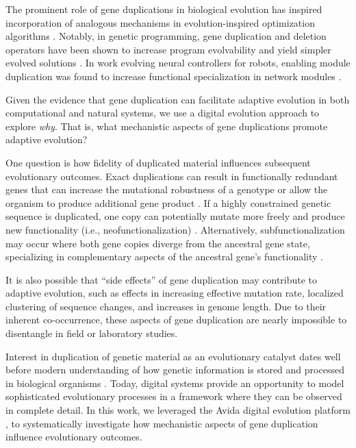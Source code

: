 The prominent role of gene duplications in biological evolution has inspired incorporation of analogous mechanisms in evolution-inspired optimization algorithms \citep{Ryan:1998gm,Sawai:1999genetic,Sawai:2000comparative,Schmitt:2005bc}.
Notably, in genetic programming, gene duplication and deletion operators have been shown to increase program evolvability and yield simpler evolved solutions \citep{Koza:1995fr}.
In work evolving neural controllers for robots, enabling module duplication was found to increase functional specialization in network modules \citep{Calabretta:1998vh,Calabretta:2000tl}.

Given the evidence that gene duplication can facilitate adaptive evolution in both computational and natural systems, we use a digital evolution approach to explore \textit{why}.
That is, what mechanistic aspects of gene duplications promote adaptive evolution?

One question is how fidelity of duplicated material influences subsequent evolutionary outcomes.
Exact duplications can result in functionally redundant genes that can increase the mutational robustness of a genotype \citep{Crow:2006role} or allow the organism to produce additional gene product \citep{Zhang:2003fw}.
If a highly constrained genetic sequence is duplicated, one copy can potentially mutate more freely and produce new functionality (i.e., neofunctionalization) \citep{Zhang:2003fw,Wagner:2003fk}.
Alternatively, subfunctionalization may occur where both gene copies diverge from the ancestral gene state, specializing in complementary aspects of the ancestral gene's functionality \citep{Zhang:2003fw}.

It is also possible that ``side effects'' of gene duplication may contribute to adaptive evolution, such as effects in increasing effective mutation rate, localized clustering of sequence changes, and increases in genome length.
Due to their inherent co-occurrence, these aspects of gene duplication are nearly impossible to disentangle in field or laboratory studies.

Interest in duplication of genetic material as an evolutionary catalyst dates well before modern understanding of how genetic information is stored and processed in biological organisms \citep{Metz:chromosomeDuplication1947}.
Today, digital systems provide an opportunity to model sophisticated evolutionary processes in a framework where they can be observed in complete detail.
In this work, we leveraged the Avida digital evolution platform \citep{ofria2004avida}, to systematically investigate how mechanistic aspects of gene duplication influence evolutionary outcomes.

